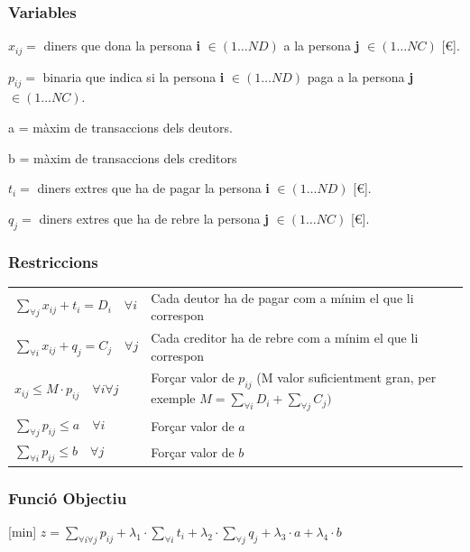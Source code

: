 \subsubsection{Variables}
\begin{description}
\item $x_{ij}=$ diners que dona la persona \textbf{i} $\in (1 \ldots ND)$ a la persona \textbf{j} $\in (1 \ldots NC)$  [€].
\item $p_{ij}=$ binaria que indica si la persona \textbf{i} $\in (1 \ldots ND)$ paga a la persona \textbf{j} $\in (1 \ldots NC)$.
\item a = màxim de transaccions dels deutors.
\item b = màxim de transaccions dels creditors 
\item $t_{i}=$ diners extres que ha de pagar la persona \textbf{i} $\in (1 \ldots ND)$  [€].
\item $q_{j}=$ diners extres que ha de rebre la persona \textbf{j} $\in (1 \ldots NC)$  [€].
\end{description}

\subsubsection{Restriccions}
\begin{tabular}{l l}
$\sum\limits_{\forall j} x_{ij} + t_{i} = D_{i} \quad \forall i$ & Cada deutor ha de pagar com a mínim el que li correspon \\

$\sum\limits_{\forall i} x_{ij} + q_{j} = C_{j} \quad \forall j$ & Cada creditor ha de rebre com a mínim el que li correspon \\

$x_{ij} \leq M \cdot p_{ij} \quad \forall i \forall j$ & Forçar valor de $p_{ij}$ (M valor suficientment gran, per exemple $M=\sum\limits_{\forall i} D_{i} + \sum\limits_{\forall j} C_{j})$\\

$\sum\limits_{\forall j} p_{ij} \leq a \quad \forall i$ & Forçar valor de $a$ \\

$\sum\limits_{\forall i} p_{ij} \leq b \quad \forall j$ & Forçar valor de $b$ \\
\end{tabular}

\subsubsection{Funció Objectiu}
[min] $z = \sum\limits_{\forall i \forall j} p_{ij} + \lambda_{1} \cdot \sum\limits_{\forall i} t_{i} + \lambda_{2} \cdot \sum\limits_{\forall j} q_{j} + \lambda_{3} \cdot a + \lambda_{4} \cdot b $


